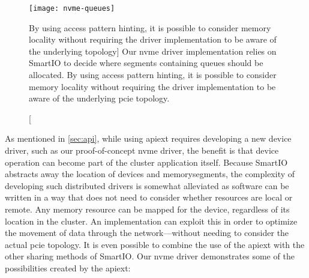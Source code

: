 \begin{figure}
    \centering
    \texttt{[image: nvme-queues]}
    \caption
    [By using access pattern hinting, it is possible to consider memory locality without requiring the driver implementation to be aware of the underlying  topology]
    {Our \gls{nvme} driver implementation relies on SmartIO to decide where \glspl{segment} containing queues should be allocated. By using access pattern hinting, it is possible to consider memory locality without requiring the driver implementation to be aware of the underlying \gls{pcie} topology.}
    \label{fig:nvme-queues}
\end{figure}


As mentioned in \cref{sec:api}, while using \gls{apiext} requires developing a new device driver, such as our proof-of-concept \gls{nvme} driver, the benefit is that device operation can become part of the cluster application itself.
%
Because SmartIO abstracts away the location of devices and \glspl{memorysegment}, the complexity of developing such distributed drivers is somewhat alleviated as software can be written in a way that does not need to consider whether resources are local or remote.
%
Any memory resource can be mapped for the device, regardless of its location in the cluster.
%
An implementation can exploit this in order to optimize the movement of data through the network---without needing to consider the actual \gls{pcie} topology.
%
It is even possible to combine the use of the \gls{apiext} with the other sharing methods of SmartIO.
%
Our \gls{nvme} driver demonstrates some of the possibilities created by the \gls{apiext}: 
%
